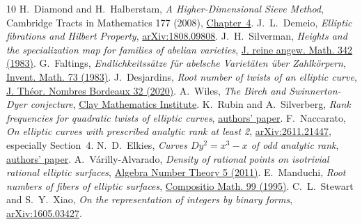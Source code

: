 \documentclass[11pt]{article}
\begin{document}
\begingroup\raggedright\begin{thebibliography}{10}
 H.~Diamond and H.~Halberstam, \emph{A Higher-Dimensional Sieve Method}, Cambridge Tracts in Mathematics 177 (2008), \href{https://www.cambridge.org/core/books/abs/higherdimensional-sieve-method/fundamental-lemma/ADA0817360576D0B04B600E5A64DBE33}{Chapter~4}.
 J.~L.~Demeio, \emph{Elliptic fibrations and Hilbert Property}, \href{https://arxiv.org/abs/1808.09808}{arXiv:1808.09808}.
 J.~H.~Silverman, \emph{Heights and the specialization map for families of abelian varieties}, \href{https://doi.org/10.1515/crll.1983.342.197}{J. reine angew. Math. 342 (1983)}.
 G.~Faltings, \emph{Endlichkeitss\"atze f\"ur abelsche Variet\"aten \"uber Zahlk\"orpern}, \href{https://doi.org/10.1007/BF01388432}{Invent. Math. 73 (1983)}.
 J.~Desjardins, \emph{Root number of twists of an elliptic curve}, \href{https://doi.org/10.5802/jtnb.1112}{J. Th\'eor. Nombres Bordeaux 32 (2020)}.
 A.~Wiles, \emph{The Birch and Swinnerton-Dyer conjecture}, \href{https://www.claymath.org/wp-content/uploads/2022/05/birchswin.pdf}{Clay Mathematics Institute}.
 K.~Rubin and A.~Silverberg, \emph{Rank frequencies for quadratic twists of elliptic curves}, \href{https://arxiv.org/abs/math/0010056}{authors' paper}.
 F.~Naccarato, \emph{On elliptic curves with prescribed analytic rank at least 2}, \href{https://arxiv.org/abs/2611.21447}{arXiv:2611.21447}, especially Section~4.
 N.~D.~Elkies, \emph{Curves $Dy^2=x^3-x$ of odd analytic rank}, \href{https://arxiv.org/abs/math/0208056}{authors' paper}.
 A.~V\'arilly-Alvarado, \emph{Density of rational points on isotrivial rational elliptic surfaces}, \href{https://msp.org/ant/2011/5-5/ant-v5-n5-p04-p.pdf}{Algebra Number Theory 5 (2011)}.
 E.~Manduchi, \emph{Root numbers of fibers of elliptic surfaces}, \href{https://www.numdam.org/item/CM_1995__99_1_33_0.pdf}{Compositio Math. 99 (1995)}.
 C.~L.~Stewart and S.~Y.~Xiao, \emph{On the representation of integers by binary forms}, \href{https://arxiv.org/abs/1605.03427}{arXiv:1605.03427}.
\end{thebibliography}\endgroup
\end{document}
